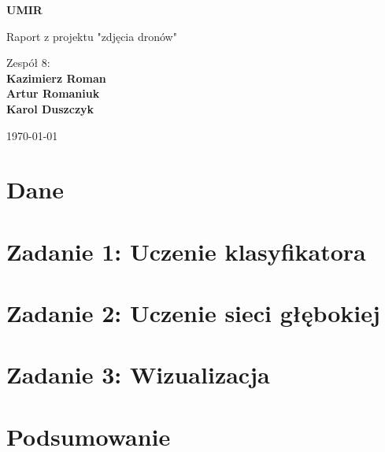 \documentclass[a4paper]{article}
\begin{document}
\begin{titlepage}
    \begin{center}
        \vspace*{1cm}
            
        \Huge
        \textbf{UMIR}
            
        \vspace{0.5cm}
        \LARGE
        Raport z projektu "zdjęcia dronów"
            
        \vspace{1.5cm}
            
        Zespół 8:\\
        \textbf{Kazimierz Roman\\
                Artur Romaniuk\\
                Karol Duszczyk}
            
        \vfill

        \vspace{0.8cm}
            
        \Large
        \today
        
            
    \end{center}
\end{titlepage}

\tableofcontents

\newpage

\section{Dane}


\section{Zadanie 1: Uczenie klasyfikatora}


\section{Zadanie 2: Uczenie sieci głębokiej}


\section{Zadanie 3: Wizualizacja}


\section{Podsumowanie}

\end{document}

